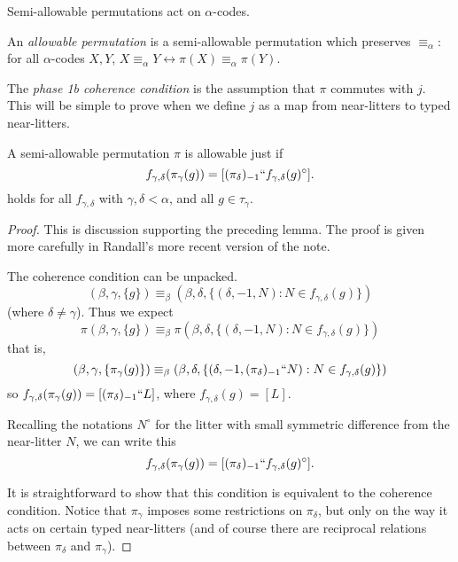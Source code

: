 \begin{definition}
\label{def:code-action}
\leanok
Semi-allowable permutations act on $\alpha$-codes.
\end{definition}

\begin{definition}
  \label{def:allowable-perm}
  \leanok
  An \emph{allowable permutation} is a semi-allowable permutation which preserves $\equiv_\alpha$: for all $\alpha$-codes $X,Y$, $X \equiv_\alpha Y \leftrightarrow \pi(X) \equiv_\alpha \pi(Y)$.
\end{definition}

\begin{definition}
  \label{def:phase-1b-coherence}
  \leanok
  The \emph{phase 1b coherence condition} is the assumption that $\pi$ commutes with $j$. This will be simple to prove when we define $j$ as a map from near-litters to typed near-litters.
\end{definition}

\begin{lemma}
\label {lem:coherence-unpacked}
\leanok
A semi-allowable permutation $\pi$ is allowable just if
$$f_{\gamma,\delta}(\pi_\gamma(g)) = [(\pi_\delta)_{-1}``f_{\gamma,\delta}(g)^\circ].$$
holds for all $f_{\gamma,\delta}$ with $\gamma,\delta<\alpha$, and all $g \in \tau_\gamma$.
\end{lemma}

\begin{proof}
This is discussion supporting the preceding lemma. The proof is given more carefully in Randall’s more recent version of the note.

The coherence condition can be unpacked.
$$(\beta,\gamma,\{g\}) \equiv_\beta (\beta,\delta,\{(\delta,-1,N):N \in f_{\gamma,\delta}(g)\})$$(where $\delta\neq \gamma$).  Thus we expect
$$\pi(\beta,\gamma,\{g\}) \equiv_\beta \pi(\beta,\delta,\{(\delta,-1,N):N \in f_{\gamma,\delta}(g)\})$$
that is,
$$(\beta,\gamma,\{\pi_\gamma(g)\}) \equiv_\beta (\beta,\delta,\{(\delta,-1,(\pi_\delta)_{-1}``N):N \in f_{\gamma,\delta}(g)\})$$
so $f_{\gamma,\delta}(\pi_\gamma(g)) = [(\pi_\delta)_{-1}``L]$, where $f_{\gamma,\delta}(g)=[L]$.

Recalling the notations $N^\circ$ for the litter with small symmetric difference from the near-litter $N$, we can write this $$f_{\gamma,\delta}(\pi_\gamma(g)) = [(\pi_\delta)_{-1}``f_{\gamma,\delta}(g)^\circ].$$

It is straightforward to show that this condition is equivalent to the coherence condition.  Notice that $\pi_\gamma$ imposes some restrictions on $\pi_\delta$, but only on the way it acts on certain typed near-litters (and of course there are reciprocal relations between $\pi_\delta$ and $\pi_\gamma$).
\end{proof}


